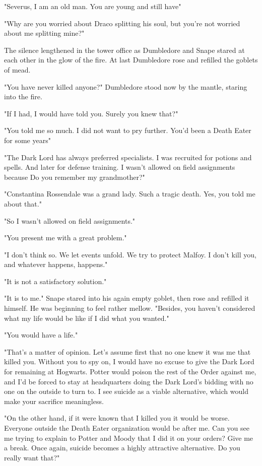 "Severus, I am an old man. You are young and still have{\el}"

"Why are you worried about Draco splitting his soul, but you're not worried about me splitting mine?"

The silence lengthened in the tower office as Dumbledore and Snape stared at each other in the glow of the fire. At last Dumbledore rose and refilled the goblets of mead.

"You have never killed anyone?" Dumbledore stood now by the mantle, staring into the fire.

"If I had, I would have told you. Surely you knew that?"

"You told me so much. I did not want to pry further. You'd been a Death Eater for some years{\el}"

"The Dark Lord has always preferred specialists. I was recruited for potions and spells. And later for defense training. I wasn't allowed on field assignments because{\el} Do you remember my grandmother?"

"Constantina Rossendale was a grand lady. Such a tragic death. Yes, you told me about that."

"So{\el} I wasn't allowed on field assignments."

"You present me with a great problem."

"I don't think so. We let events unfold. We try to protect Malfoy. I don't kill you, and whatever happens, happens."

"It is not a satisfactory solution."

"It is to me." Snape stared into his again empty goblet, then rose and refilled it himself. He was beginning to feel rather mellow. "Besides, you haven't considered what my life would be like if I did what you wanted."

"You would have a life."

"That's a matter of opinion. Let's assume first that no one knew it was me that killed you. Without you to spy on, I would have no excuse to give the Dark Lord for remaining at Hogwarts. Potter would poison the rest of the Order against me, and I'd be forced to stay at headquarters doing the Dark Lord's bidding with no one on the outside to turn to. I see suicide as a viable alternative, which would make your sacrifice meaningless.

"On the other hand, if it were known that I killed you it would be worse. Everyone outside the Death Eater organization would be after me. Can you see me trying to explain to Potter and Moody that I did it on your orders? Give me a break. Once again, suicide becomes a highly attractive alternative. Do you really want that?"

